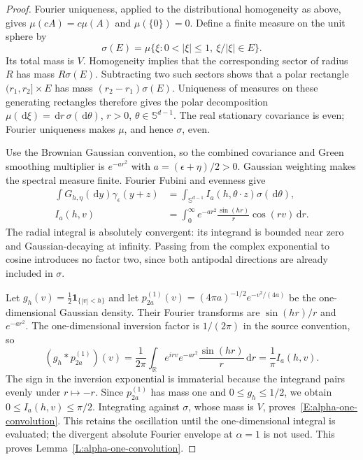 \documentclass[12pt]{article}
\numberwithin{equation}{section}
\theoremstyle{definition}
\newcommand{\R}{\mathbb{R}}
\newcommand{\ud}{\,\mathrm{d}}
\begin{document}
\begin{proof}
  Fourier uniqueness, applied to the distributional homogeneity as
  above, gives $\mu(cA)=c\mu(A)$ and $\mu(\{0\})=0$.
  Define a finite measure on the unit sphere by
  \[
    \sigma(E)=\mu\{\xi:0<|\xi|\le1,\ \xi/|\xi|\in E\}.
  \]
  Its total mass is $V$. Homogeneity implies that the corresponding
  sector of radius $R$ has mass $R\sigma(E)$. Subtracting two such
  sectors shows that a polar rectangle $(r_1,r_2]\times E$ has mass
  $(r_2-r_1)\sigma(E)$. Uniqueness of measures on these generating
  rectangles therefore gives the polar decomposition
  $\mu(\ud\xi)=\ud r\,\sigma(\ud\theta)$, $r>0$,
  $\theta\in\mathbb S^{d-1}$. The real stationary covariance is
  even; Fourier uniqueness makes $\mu$, and hence $\sigma$, even.

  Use the Brownian Gaussian convention, so the combined covariance
  and Green smoothing multiplier is $e^{-ar^2}$ with
  $a=(\epsilon+\eta)/2>0$. Gaussian weighting makes the spectral
  measure finite. Fourier Fubini and evenness give
  \begin{equation}\label{E:alpha-one-polar}
    \begin{split}
      \int G_{h,\eta}(\ud y)\gamma_\epsilon(y+z)
      &=\int_{\mathbb S^{d-1}} I_a(h,\theta\cdot z)\sigma(\ud\theta),\\
      I_a(h,v)&=\int_0^\infty e^{-ar^2}
      \frac{\sin(hr)}r\cos(rv)\ud r.
    \end{split}
  \end{equation}
  The radial integral is absolutely convergent: its integrand is
  bounded near zero and Gaussian-decaying at infinity. Passing from
  the complex exponential to cosine introduces no factor two, since
  both antipodal directions are already included in $\sigma$.

  Let $g_h(v)=\tfrac12\mathbf1_{\{|v|<h\}}$ and let
  $p_{2a}^{(1)}(v)=(4\pi a)^{-1/2}e^{-v^2/(4a)}$ be the
  one-dimensional Gaussian density. Their Fourier transforms are
  $\sin(hr)/r$ and $e^{-ar^2}$. The one-dimensional inversion factor
  is $1/(2\pi)$ in the source convention, so
  \[
    (g_h*p_{2a}^{(1)})(v)
    =\frac1{2\pi}\int_\R e^{irv}e^{-ar^2}
    \frac{\sin(hr)}r\ud r
    =\frac1\pi I_a(h,v).
  \]
  The sign in the inversion exponential is immaterial because the
  integrand pairs evenly under $r\mapsto-r$. Since $p_{2a}^{(1)}$
  has mass one and $0\le g_h\le1/2$, we obtain
  $0\le I_a(h,v)\le\pi/2$. Integrating against $\sigma$, whose mass
  is $V$, proves~\eqref{E:alpha-one-convolution}. This retains the
  oscillation until the one-dimensional integral is evaluated; the
  divergent absolute Fourier envelope at $\alpha=1$ is not used.
  This proves Lemma~\ref{L:alpha-one-convolution}.
\end{proof}
\end{document}
